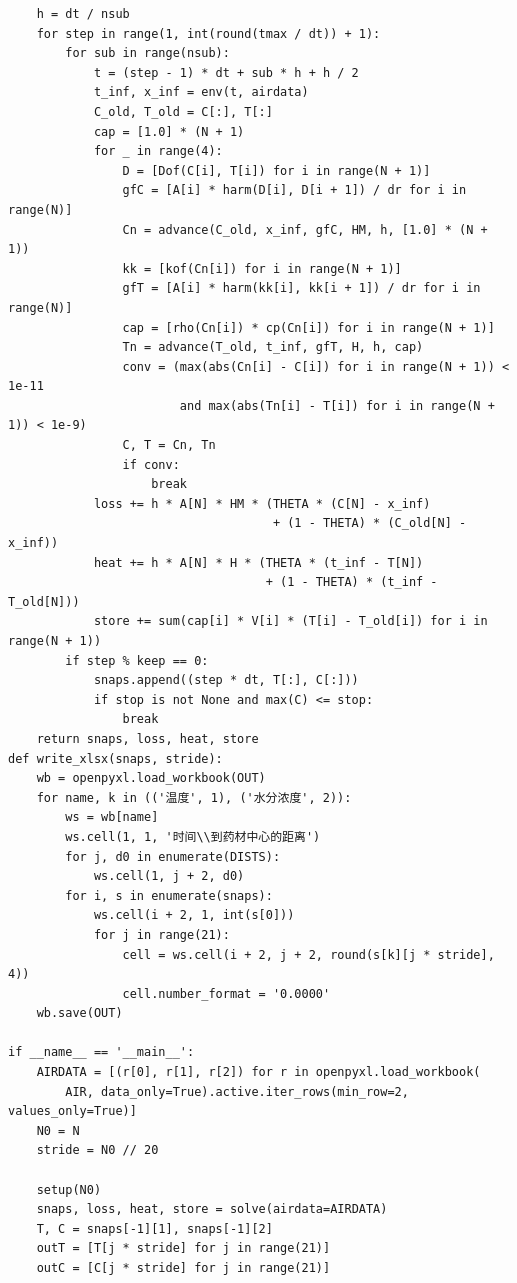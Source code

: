 \documentclass[12pt,a4paper]{article}
\begin{document}
\begin{lstlisting}
    h = dt / nsub
    for step in range(1, int(round(tmax / dt)) + 1):
        for sub in range(nsub):
            t = (step - 1) * dt + sub * h + h / 2
            t_inf, x_inf = env(t, airdata)
            C_old, T_old = C[:], T[:]
            cap = [1.0] * (N + 1)
            for _ in range(4):                    
                D = [Dof(C[i], T[i]) for i in range(N + 1)]
                gfC = [A[i] * harm(D[i], D[i + 1]) / dr for i in range(N)]
                Cn = advance(C_old, x_inf, gfC, HM, h, [1.0] * (N + 1))
                kk = [kof(Cn[i]) for i in range(N + 1)]
                gfT = [A[i] * harm(kk[i], kk[i + 1]) / dr for i in range(N)]
                cap = [rho(Cn[i]) * cp(Cn[i]) for i in range(N + 1)]
                Tn = advance(T_old, t_inf, gfT, H, h, cap)
                conv = (max(abs(Cn[i] - C[i]) for i in range(N + 1)) < 1e-11
                        and max(abs(Tn[i] - T[i]) for i in range(N + 1)) < 1e-9)
                C, T = Cn, Tn
                if conv:
                    break
            loss += h * A[N] * HM * (THETA * (C[N] - x_inf)
                                     + (1 - THETA) * (C_old[N] - x_inf))
            heat += h * A[N] * H * (THETA * (t_inf - T[N])
                                    + (1 - THETA) * (t_inf - T_old[N]))
            store += sum(cap[i] * V[i] * (T[i] - T_old[i]) for i in range(N + 1))
        if step % keep == 0:
            snaps.append((step * dt, T[:], C[:]))
            if stop is not None and max(C) <= stop:
                break
    return snaps, loss, heat, store
def write_xlsx(snaps, stride):
    wb = openpyxl.load_workbook(OUT)
    for name, k in (('温度', 1), ('水分浓度', 2)):
        ws = wb[name]
        ws.cell(1, 1, '时间\\到药材中心的距离')
        for j, d0 in enumerate(DISTS):
            ws.cell(1, j + 2, d0)
        for i, s in enumerate(snaps):
            ws.cell(i + 2, 1, int(s[0]))
            for j in range(21):
                cell = ws.cell(i + 2, j + 2, round(s[k][j * stride], 4))
                cell.number_format = '0.0000'
    wb.save(OUT)

if __name__ == '__main__':
    AIRDATA = [(r[0], r[1], r[2]) for r in openpyxl.load_workbook(
        AIR, data_only=True).active.iter_rows(min_row=2, values_only=True)]
    N0 = N
    stride = N0 // 20

    setup(N0)
    snaps, loss, heat, store = solve(airdata=AIRDATA)
    T, C = snaps[-1][1], snaps[-1][2]
    outT = [T[j * stride] for j in range(21)]
    outC = [C[j * stride] for j in range(21)]


\end{lstlisting}
\end{document}
